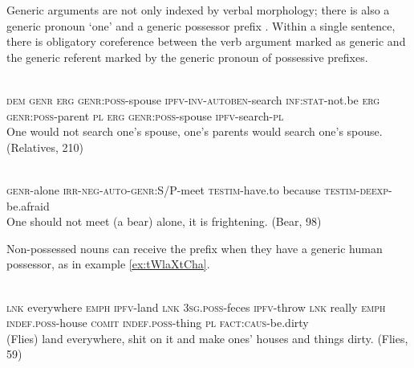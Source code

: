 Generic arguments are not only indexed by verbal morphology; there is also a generic pronoun  `one' and a generic possessor prefix . Within a single sentence, there is obligatory coreference between the verb argument marked as generic and the generic referent marked by the generic pronoun of possessive prefixes.

\begin{exe}
\ex \label{ex:YWwGnWCar}
\gll
{} 	 	 	 	 	 	 	 	 	 	 	 	\\
\textsc{dem} \textsc{genr} \textsc{erg} \textsc{genr:poss}-spouse \textsc{ipfv-inv-autoben}-search \textsc{inf:stat}-not.be \textsc{erg} \textsc{genr:poss}-parent \textsc{pl} \textsc{erg} \textsc{genr:poss}-spouse \textsc{ipfv}-search-\textsc{pl} \\
\glt One would not search one's spouse, one's parents would search one's spouse. (Relatives, 210)
\end{exe}


\begin{exe}
\ex \label{ex:YWwGnWCar}
\gll
{}  	  	  	  	  \\
\textsc{genr}-alone \textsc{irr-neg-auto-genr:S/P}-meet \textsc{testim}-have.to because \textsc{testim-deexp}-be.afraid \\
\glt One should not meet (a bear) alone, it is frightening. (Bear, 98)
\end{exe}


Non-possessed nouns can receive the prefix  when they have a generic human possessor, as in example \ref{ex:tWlaXtCha}. 

\begin{exe}
\ex \label{ex:tWlaXtCha}
\gll 
{}  	  	  	  	  	  	  		  	  	  	  	  	  	  \\
\textsc{lnk} everywhere \textsc{emph} \textsc{ipfv}-land \textsc{lnk} \textsc{3sg.poss}-feces \textsc{ipfv}-throw \textsc{lnk} really \textsc{emph} \textsc{indef.poss}-house \textsc{comit} \textsc{indef.poss}-thing \textsc{pl} \textsc{fact:caus}-be.dirty \\
\glt (Flies) land everywhere, shit on it and make ones' houses and things dirty. (Flies, 59)
\end{exe}




